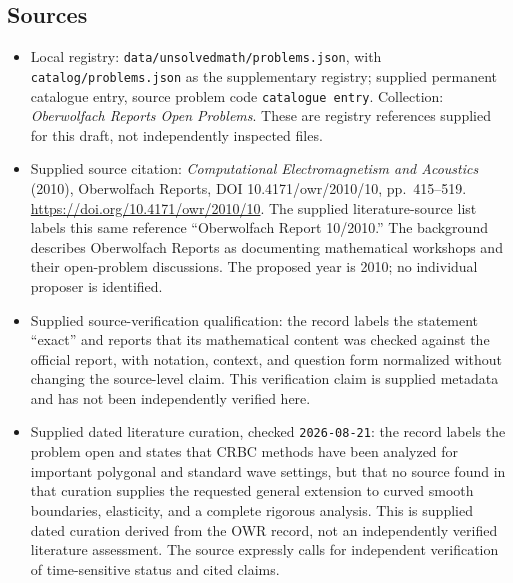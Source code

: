 \documentclass[11pt]{article}
\begin{document}
\subsection{Sources}
\begin{itemize}
\item Local registry: \texttt{data/unsolvedmath/problems.json}, with \texttt{catalog/problems.json} as the supplementary registry; supplied permanent catalogue entry, source problem code \texttt{catalogue entry}. Collection: \emph{Oberwolfach Reports Open Problems}. These are registry references supplied for this draft, not independently inspected files.
\item Supplied source citation: \emph{Computational Electromagnetism and Acoustics} (2010), Oberwolfach Reports, DOI 10.4171/owr/2010/10, pp.~415--519. \url{https://doi.org/10.4171/owr/2010/10}. The supplied literature-source list labels this same reference ``Oberwolfach Report 10/2010.'' The background describes Oberwolfach Reports as documenting mathematical workshops and their open-problem discussions. The proposed year is 2010; no individual proposer is identified.
\item Supplied source-verification qualification: the record labels the statement ``exact'' and reports that its mathematical content was checked against the official report, with notation, context, and question form normalized without changing the source-level claim. This verification claim is supplied metadata and has not been independently verified here.
\item Supplied dated literature curation, checked \texttt{2026-08-21}: the record labels the problem open and states that CRBC methods have been analyzed for important polygonal and standard wave settings, but that no source found in that curation supplies the requested general extension to curved smooth boundaries, elasticity, and a complete rigorous analysis. This is supplied dated curation derived from the OWR record, not an independently verified literature assessment. The source expressly calls for independent verification of time-sensitive status and cited claims.
\end{itemize}
\end{document}
